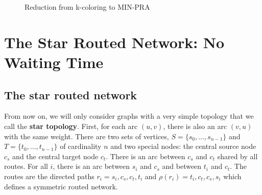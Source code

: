 \documentclass[a4paper,10pt]{article}
\begin{document}
{\begin{figure}[ht]
{
    }
    \caption{Reduction from k-coloring to MIN-PRA}
    \label{fig:reduction}
    \end{figure}
    
\section{The Star Routed Network: No Waiting Time} \label{sec:PAZL}
  
   
    
    \subsection{The star routed network}
    
      From now on, we will only consider graphs with a very simple topology that we call the {\bf star topology}. 
      First, for each arc $(u,v)$, there is also an arc $(v,u)$ with the same weight.
      There are two sets of vertices, $S=\{s_0,...,s_{n-1}\}$ and $T=\{t_0,...,t_{n-1}\}$ of cardinality $n$ and two special nodes:
      the central source node {\bf $c_s$} and the central target node {\bf $c_t$}. There is an arc between {\bf $c_s$} and {\bf $c_t$} shared by all routes. For all $i$, there is an arc between $s_i$ and $c_s$ and between $t_i$ and $c_t$.
      The routes are the directed paths $r_i = s_i,c_s,c_t,t_i$ and $\rho(r_i) = t_i,c_t,c_s,s_i$ which defines a 
      symmetric routed network. 
      
}
\end{document}
